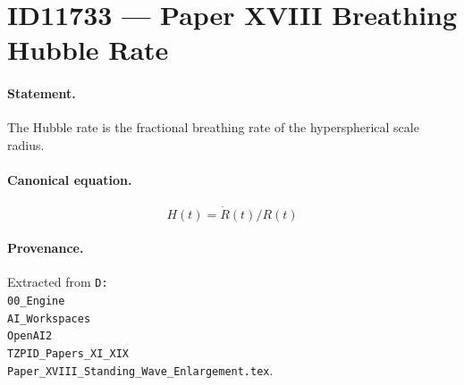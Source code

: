 \section*{ID11733 --- Paper XVIII Breathing Hubble Rate}

\paragraph{Statement.}
The Hubble rate is the fractional breathing rate of the hyperspherical scale radius.

\paragraph{Canonical equation.}
\[
H(t)=\dot R(t)/R(t)
\]

\paragraph{Provenance.}
Extracted from \texttt{D:\\00\_Engine\\AI\_Workspaces\\OpenAI2\\TZPID\_Papers\_XI\_XIX\\Paper\_XVIII\_Standing\_Wave\_Enlargement.tex}.
